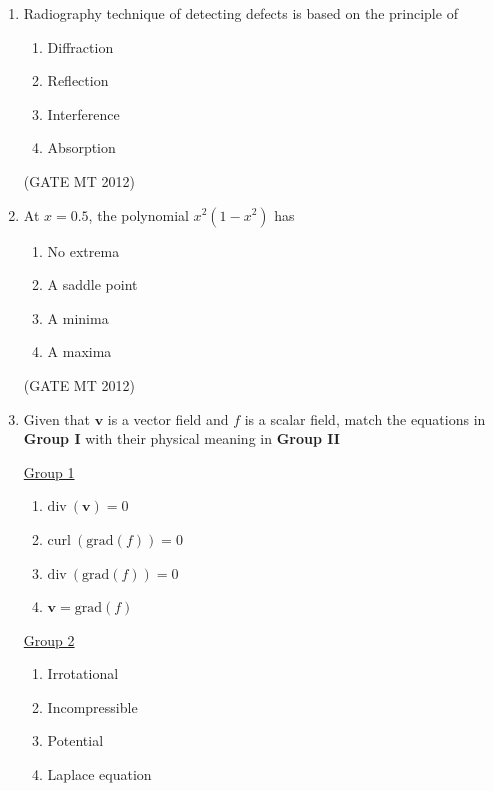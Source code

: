 \documentclass[journal, 11pt, onecolumn]{IEEEtran}
\theoremstyle{remark}
\begin{document}
\begin{enumerate}
\begin{enumerate}
\item Radiography technique of detecting defects is based on the principle of

\begin{multicols}{4}
\begin{enumerate}  
\item Diffraction
\item Reflection
\item Interference
\item Absorption
\end{enumerate}
\end{multicols}
\hfill(GATE MT 2012)

\item At \(x=0.5\), the polynomial \(x^2(1-x^2)\) has

\begin{multicols}{4}
\begin{enumerate}  
\item No extrema
\item A saddle point
\item A minima
\item A maxima
\end{enumerate}
\end{multicols}
\hfill(GATE MT 2012)

\item Given that $\mathbf{v}$ is a vector field and $f$ is a scalar field, match the equations in \textbf{Group I} with their physical meaning in \textbf{Group II}
\begin{multicols}{2}
\underline{Group 1}
\begin{enumerate}[label=(\Alph*), start=16]
\item $\mathrm{div}\ (\mathbf{v}) = 0$  
\item $\mathrm{curl}\ (\mathrm{grad}(f)) = 0$
\item $\mathrm{div}\ (\mathrm{grad}(f)) = 0$
\item $\mathbf{v} = \mathrm{grad}(f)$
\end{enumerate}

\underline{Group 2}
\begin{enumerate}[label=(\arabic*), start=1]
\item Irrotational 
\item Incompressible
\item Potential
\item Laplace equation 
\end{enumerate}
\end{multicols}


\end{enumerate}
\end{enumerate}
\end{document}
